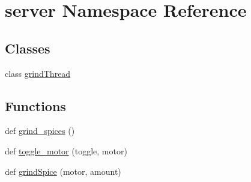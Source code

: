 \hypertarget{namespaceserver}{}\section{server Namespace Reference}
\label{namespaceserver}
\subsection*{Classes}
\begin{DoxyCompactItemize}
\item 
class \hyperlink{classserver_1_1grindThread}{grind\+Thread}
\end{DoxyCompactItemize}
\subsection*{Functions}
\begin{DoxyCompactItemize}
\item 
def \hyperlink{namespaceserver_a75787b710d8b51211cadba79bcabd4a3}{grind\+\_\+spices} ()
\item 
def \hyperlink{namespaceserver_a62878c2fc95cc9fa348ba9991469b547}{toggle\+\_\+motor} (toggle, motor)
\item 
def \hyperlink{namespaceserver_aaf13ef922d3ac748ade202c5636b1005}{grind\+Spice} (motor, amount)
\end{DoxyCompactItemize}
